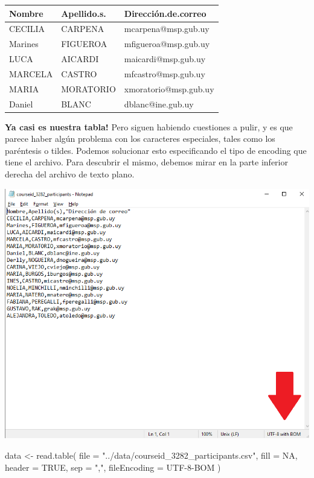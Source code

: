 \documentclass[
  letterpaper,
  DIV=11,
  numbers=noendperiod]{scrreprt}
\newenvironment{Shaded}{\begin{snugshade}}{\end{snugshade}}
\newcommand{\AttributeTok}[1]{\textcolor[rgb]{0.40,0.45,0.13}{#1}}
\newcommand{\ConstantTok}[1]{\textcolor[rgb]{0.56,0.35,0.01}{#1}}
\newcommand{\FunctionTok}[1]{\textcolor[rgb]{0.28,0.35,0.67}{#1}}
\newcommand{\NormalTok}[1]{\textcolor[rgb]{0.00,0.23,0.31}{#1}}
\newcommand{\OtherTok}[1]{\textcolor[rgb]{0.00,0.23,0.31}{#1}}
\newcommand{\StringTok}[1]{\textcolor[rgb]{0.13,0.47,0.30}{#1}}
\begin{document}
\begin{longtable}[]{@{}lll@{}}
\toprule()
Nombre & Apellido.s. & Dirección.de.correo \\
\midrule()
\endhead
CECILIA & CARPENA & mcarpena@msp.gub.uy \\
Marines & FIGUEROA & mfigueroa@msp.gub.uy \\
LUCA & AICARDI & maicardi@msp.gub.uy \\
MARCELA & CASTRO & mfcastro@msp.gub.uy \\
MARIA & MORATORIO & xmoratorio@msp.gub.uy \\
Daniel & BLANC & dblanc@ine.gub.uy \\
\bottomrule()
\end{longtable}

\textbf{Ya casi es nuestra tabla!} Pero siguen habiendo cuestiones a
pulir, y es que parece haber algún problema con los caracteres
especiales, tales como los paréntesis o tildes. Podemos solucionar esto
especificando el tipo de encoding que tiene el archivo. Para descubrir
el mismo, debemos mirar en la parte inferior derecha del archivo de
texto plano.

\includegraphics{chapters/images/encoding_2.png}

\begin{Shaded}
\begin{Highlighting}[]
\NormalTok{data }\OtherTok{\textless{}{-}} \FunctionTok{read.table}\NormalTok{(}
  \AttributeTok{file =} \StringTok{"../data/courseid\_3282\_participants.csv"}\NormalTok{, }
  \AttributeTok{fill =} \ConstantTok{NA}\NormalTok{,}
  \AttributeTok{header =} \ConstantTok{TRUE}\NormalTok{,}
  \AttributeTok{sep =} \StringTok{","}\NormalTok{,}
  \AttributeTok{fileEncoding =} \StringTok{\textquotesingle{}UTF{-}8{-}BOM\textquotesingle{}}
\NormalTok{)}
\end{Highlighting}
\end{Shaded}
\end{document}
